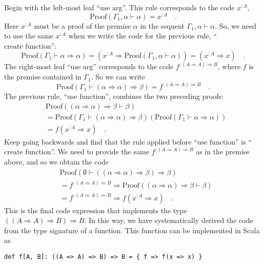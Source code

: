 Begin with the left-most leaf ``$\text{use arg}$''. This rule corresponds
to the code $x^{:A}$,
\[
\text{Proof}\left(\Gamma_{1},\alpha\vdash\alpha\right)=x^{:A}\quad.
\]
Here $x^{:A}$ must be a proof of the premise $\alpha$ in the sequent
$\Gamma_{1},\alpha\vdash\alpha$. So, we need to use the same $x^{:A}$
when we write the code for the previous rule, ``$\text{create function}$'':
\[
\text{Proof}\left(\Gamma_{1}\vdash\alpha\Rightarrow\alpha\right)=(x^{:A}\Rightarrow\text{Proof}\left(\Gamma_{1},\alpha\vdash\alpha\right))=(x^{:A}\Rightarrow x)\quad.
\]
The right-most leaf ``$\text{use arg}$'' corresponds to the code
$f^{:(A\Rightarrow A)\Rightarrow B}$, where $f$ is the premise contained
in $\Gamma_{1}$. So we can write
\[
\text{Proof}\left(\Gamma_{1}\vdash(\alpha\Rightarrow\alpha)\Rightarrow\beta\right)=f^{:(A\Rightarrow A)\Rightarrow B}\quad.
\]
The previous rule, ``$\text{use function}$'', combines the two
preceding proofs:
\begin{align*}
 & \text{Proof}\left((\alpha\Rightarrow\alpha)\Rightarrow\beta\vdash\beta\right)\\
 & =\text{Proof}(\Gamma_{1}\vdash(\alpha\Rightarrow\alpha)\Rightarrow\beta)\left(\text{Proof}(\Gamma_{1}\vdash\alpha\Rightarrow\alpha)\right)\\
 & =f(x^{:A}\Rightarrow x)\quad.
\end{align*}
Keep going backwards and find that the rule applied before ``$\text{use function}$''
is ``$\text{create function}$''. We need to provide the same $f^{:\left(A\Rightarrow A\right)\Rightarrow B}$
as in the premise above, and so we obtain the code
\begin{align*}
 & \text{Proof}\left(\emptyset\vdash((\alpha\Rightarrow\alpha)\Rightarrow\beta)\Rightarrow\beta\right)\\
 & =f^{:\left(A\Rightarrow A\right)\Rightarrow B}\Rightarrow\text{Proof}\left((\alpha\Rightarrow\alpha)\Rightarrow\beta\vdash\beta\right)\\
 & =f^{:\left(A\Rightarrow A\right)\Rightarrow B}\Rightarrow f(x^{:A}\Rightarrow x)\quad.
\end{align*}
This is the final code expression that implements the type $(\left(A\Rightarrow A\right)\Rightarrow B)\Rightarrow B$.
In this way, we have systematically derived the code from the type
signature of a function. This function can be implemented in Scala
as
\begin{lstlisting}
def f[A, B]: ((A => A) => B) => B = { f => f(x => x) }
\end{lstlisting}

